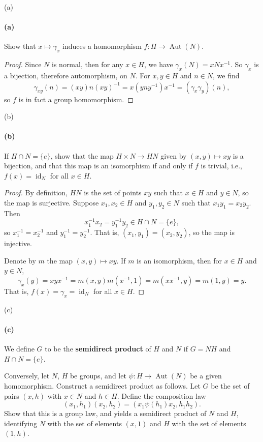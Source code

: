 \documentclass[12pt]{article}
\newlength{\myparskip}
\newenvironment{fullbox}{\begin{lrbox}{\savefullbox}\begin{minipage}{\dimexpr\textwidth-2\fboxsep\relax}\setlength{\parskip}{\myparskip}}{\end{minipage}\end{lrbox}\framebox[\textwidth]{\usebox{\savefullbox}}}
\newenvironment{pbox}[1][]{\begin{fullbox}\ifx#1\empty\else\paragraph{#1}\fi}{\end{fullbox}}
\newcommand{\<}{\langle}
\renewcommand{\>}{\rangle}
\DeclareMathOperator{\id}{id}
\DeclareMathOperator{\Aut}{Aut}
\begin{document}
\begin{pbox}[(a)]
    Show that $x \mapsto \gamma_x$ induces a homomorphism $f : H \to \Aut(N)$.
\end{pbox}

\begin{proof}
    Since $N$ is normal, then for any $x \in H$, we have $\gamma_x(N) = xNx^{-1}$. So $\gamma_x$ is a bijection, therefore automorphism, on $N$. For $x, y \in H$ and $n \in N$, we find
    \[
        \gamma_{xy}(n)
            = (xy)n(xy)^{-1}
            = x(yny^{-1})x^{-1}
            = (\gamma_x\gamma_y)(n),
    \]
    so $f$ is in fact a group homomorphism.
    
\end{proof}

\begin{pbox}[(b)]
    If $H \cap N = \{e\}$, show that the map $H \times N \to HN$ given by $(x, y) \mapsto xy$ is a bijection, and that this map is an isomorphism if and only if $f$ is trivial, i.e., $f(x) = \id_N$ for all $x \in H$.
\end{pbox}

\begin{proof}
    By definition, $HN$ is the set of points $xy$ such that $x \in H$ and $y \in N$, so the map is surjective. Suppose $x_1, x_2 \in H$ and $y_1, y_2 \in N$ such that $x_1y_1 = x_2y_2$. Then
    \[
        x_1^{-1}x_2
            = y_1^{-1}y_2
            \in H \cap N
            = \{e\},
    \]
    so $x_1^{-1} = x_2^{-1}$ and $y_1^{-1} = y_2^{-1}$. That is, $(x_1, y_1) = (x_2, y_2)$, so the map is injective.

    Denote by $m$ the map $(x, y) \mapsto xy$. If $m$ is an isomorphism, then for $x \in H$ and $y \in N$,
    \[
        \gamma_x(y)
            = xyx^{-1}
            = m(x, y)m(x^{-1}, 1)
            = m(xx^{-1}, y)
            = m(1, y)
            = y.
    \]
    That is, $f(x) = \gamma_x = \id_N$ for all $x \in H$.

\end{proof}

\begin{pbox}[(c)]
    We define $G$ to be the \textbf{semidirect product} of $H$ and $N$ if $G = NH$ and $H \cap N = \{e\}$.

    Conversely, let $N$, $H$ be groups, and let $\psi : H \to \Aut(N)$ be a given homomorphism. Construct a semidirect product as follows. Let $G$ be the set of pairs $(x, h)$ with $x \in N$ and $h \in H$. Define the composition law
    \[
        (x_1, h_1)(x_2, h_2) = (x_1 \psi(h_1) x_2, h_1 h_2).
    \]
    Show that this is a group law, and yields a semidirect product of $N$ and $H$, identifying $N$ with the set of elements $(x, 1)$ and $H$ with the set of elements $(1, h)$.
\end{pbox}
\end{document}
